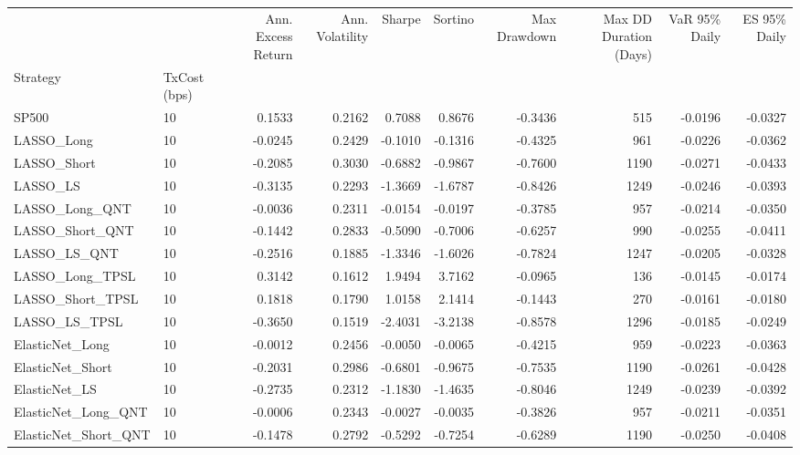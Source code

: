 \begin{tabular}{llrrrrrrrr}
\toprule
 &  & Ann. Excess Return & Ann. Volatility & Sharpe & Sortino & Max Drawdown & Max DD Duration (Days) & VaR 95\% Daily & ES 95\% Daily \\
Strategy & TxCost (bps) &  &  &  &  &  &  &  &  \\
\midrule
SP500 & 10 & 0.1533 & 0.2162 & 0.7088 & 0.8676 & -0.3436 & 515 & -0.0196 & -0.0327 \\
\cline{1-10}
LASSO\_Long & 10 & -0.0245 & 0.2429 & -0.1010 & -0.1316 & -0.4325 & 961 & -0.0226 & -0.0362 \\
\cline{1-10}
LASSO\_Short & 10 & -0.2085 & 0.3030 & -0.6882 & -0.9867 & -0.7600 & 1190 & -0.0271 & -0.0433 \\
\cline{1-10}
LASSO\_LS & 10 & -0.3135 & 0.2293 & -1.3669 & -1.6787 & -0.8426 & 1249 & -0.0246 & -0.0393 \\
\cline{1-10}
LASSO\_Long\_QNT & 10 & -0.0036 & 0.2311 & -0.0154 & -0.0197 & -0.3785 & 957 & -0.0214 & -0.0350 \\
\cline{1-10}
LASSO\_Short\_QNT & 10 & -0.1442 & 0.2833 & -0.5090 & -0.7006 & -0.6257 & 990 & -0.0255 & -0.0411 \\
\cline{1-10}
LASSO\_LS\_QNT & 10 & -0.2516 & 0.1885 & -1.3346 & -1.6026 & -0.7824 & 1247 & -0.0205 & -0.0328 \\
\cline{1-10}
LASSO\_Long\_TPSL & 10 & 0.3142 & 0.1612 & 1.9494 & 3.7162 & -0.0965 & 136 & -0.0145 & -0.0174 \\
\cline{1-10}
LASSO\_Short\_TPSL & 10 & 0.1818 & 0.1790 & 1.0158 & 2.1414 & -0.1443 & 270 & -0.0161 & -0.0180 \\
\cline{1-10}
LASSO\_LS\_TPSL & 10 & -0.3650 & 0.1519 & -2.4031 & -3.2138 & -0.8578 & 1296 & -0.0185 & -0.0249 \\
\cline{1-10}
ElasticNet\_Long & 10 & -0.0012 & 0.2456 & -0.0050 & -0.0065 & -0.4215 & 959 & -0.0223 & -0.0363 \\
\cline{1-10}
ElasticNet\_Short & 10 & -0.2031 & 0.2986 & -0.6801 & -0.9675 & -0.7535 & 1190 & -0.0261 & -0.0428 \\
\cline{1-10}
ElasticNet\_LS & 10 & -0.2735 & 0.2312 & -1.1830 & -1.4635 & -0.8046 & 1249 & -0.0239 & -0.0392 \\
\cline{1-10}
ElasticNet\_Long\_QNT & 10 & -0.0006 & 0.2343 & -0.0027 & -0.0035 & -0.3826 & 957 & -0.0211 & -0.0351 \\
\cline{1-10}
ElasticNet\_Short\_QNT & 10 & -0.1478 & 0.2792 & -0.5292 & -0.7254 & -0.6289 & 1190 & -0.0250 & -0.0408 \\

\end{tabular}
